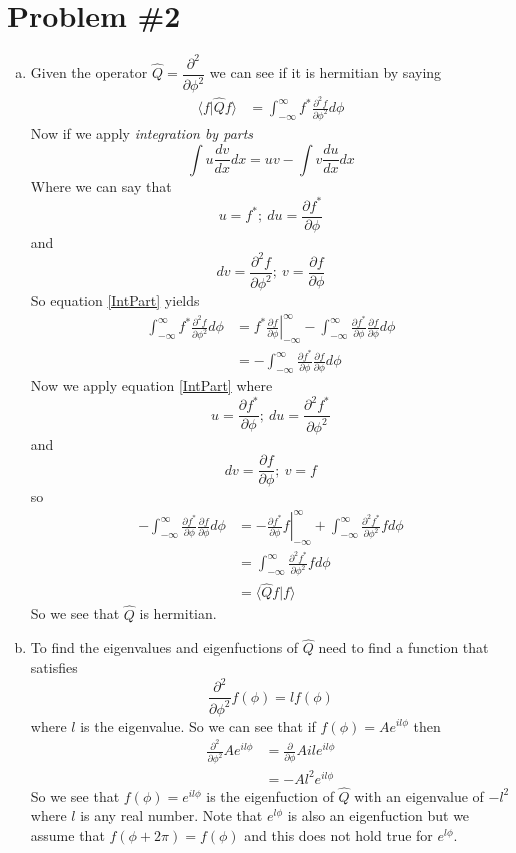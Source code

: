 \documentclass[11pt]{article}
\numberwithin{equation}{section}
\newcommand{\norm}[2]{\langle{#1}|{#2}\rangle}
\begin{document}
\section{Problem \#2}
\begin{enumerate}[(a)]
\item
Given the operator $\hat{Q} = \dfrac{\partial^2}{\partial\phi^2}$ we can see if it is hermitian by saying
\begin{align*}
\norm{f}{\hat{Q}f} &= \int_{-\infty}^{\infty}f^*\frac{\partial^2f}{\partial\phi^2}d\phi
\end{align*}
Now if we apply \emph{integration by parts}
\begin{equation}
\int u\frac{dv}{dx}dx = uv - \int v\frac{du}{dx}dx
\label{IntPart}
\end{equation}
Where we can say that 
$$u = f^*;\ du = \frac{\partial f^*}{\partial\phi}$$
and
$$dv = \frac{\partial^2f}{\partial\phi^2};\ v= \frac{\partial f}{\partial\phi}$$
So equation \ref{IntPart} yields
\begin{align*}
\int_{-\infty}^{\infty}f^*\frac{\partial^2f}{\partial\phi^2}d\phi &= \left.f^*\frac{\partial f}{\partial\phi}\right|_{-\infty}^{\infty} - \int_{-\infty}^{\infty}\frac{\partial f^*}{\partial\phi}\frac{\partial f}{\partial\phi}d\phi\\
&=  -\int_{-\infty}^{\infty}\frac{\partial f^*}{\partial\phi}\frac{\partial f}{\partial\phi}d\phi
\end{align*}
Now we apply equation \ref{IntPart} where
$$u = \frac{\partial f^*}{\partial\phi};\ du = \frac{\partial^2f^*}{\partial\phi^2}$$
and
$$dv = \frac{\partial f}{\partial\phi};\ v = f$$
so 
\begin{align*}
-\int_{-\infty}^{\infty}\frac{\partial f^*}{\partial\phi}\frac{\partial f}{\partial\phi}d\phi &= -\left.\frac{\partial f^*}{\partial\phi}f\right|_{-\infty}^{\infty} + \int_{-\infty}^{\infty} \frac{\partial^2f^*}{\partial\phi^2}fd\phi\\
&= \int_{-\infty}^{\infty} \frac{\partial^2f^*}{\partial\phi^2}fd\phi\\
&= \norm{\hat{Q}f}{f}
\end{align*}
So we see that $\hat{Q}$ is hermitian.

\item
To find the eigenvalues and eigenfuctions of $\hat{Q}$ need to find a function that satisfies 
$$\frac{\partial^2}{\partial\phi^2}f(\phi) = lf(\phi)$$
where $l$ is the eigenvalue. So we can see that if $f(\phi) = Ae^{il\phi}$ then
\begin{align*}
\frac{\partial^2}{\partial\phi^2} Ae^{il\phi} &= \frac{\partial}{\partial\phi} Aile^{il\phi}\\ 
&= -Al^2e^{il\phi}
\end{align*}
So we see that $f(\phi) = e^{il\phi}$ is the eigenfuction of $\hat{Q}$ with an eigenvalue of $-l^2$ where $l$ is any real number. Note that $e^{l\phi}$ is also an eigenfuction but we assume that $f(\phi+2\pi) = f(\phi)$ and this does not hold true for $e^{l\phi}$.


\end{enumerate}
\end{document}

